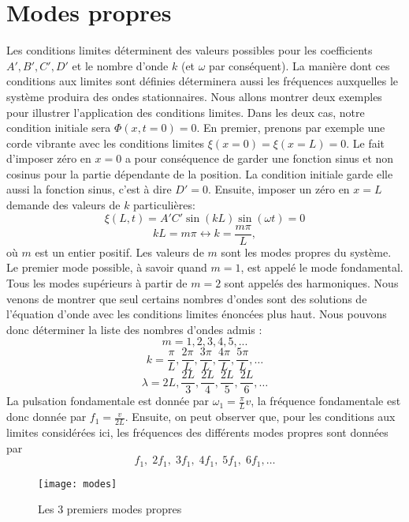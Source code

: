 \section{Modes propres}
Les conditions limites déterminent des valeurs possibles pour les coefficients $A', B', C', D'$ et le nombre d'onde $k$ (et $\omega$ par conséquent). La manière dont ces conditions aux limites sont définies déterminera aussi les fréquences auxquelles le système produira des ondes stationnaires.
Nous allons montrer deux exemples pour illustrer l'application des conditions limites. Dans les deux cas, notre condition initiale sera $\Phi(x,t=0)=0$. En premier, prenons par exemple une corde vibrante  avec les conditions limites $\xi(x=0)=\xi(x=L)=0$. Le fait d'imposer zéro en $x=0$ a pour conséquence de garder une fonction sinus et non cosinus pour la partie dépendante de la position. La condition initiale garde elle aussi la fonction sinus, c'est à dire $D'=0$. Ensuite, imposer un zéro en $x=L$ demande des valeurs de $k$ particulières: 
\[\xi(L,t)=A'C'\sin(kL)\sin(\omega t)=0\]
\[ kL = m\pi \leftrightarrow k=\frac{m\pi}{L},\] 
où $m$ est un entier positif. Les valeurs de $m$ sont les modes propres du système. Le premier mode possible, à savoir quand $m=1$, est appelé le mode fondamental. Tous les modes supérieurs à partir de $m=2$ sont appelés des harmoniques. Nous venons de montrer que seul certains nombres d'ondes sont des solutions de l'équation d'onde avec les conditions limites énoncées plus haut. Nous pouvons donc déterminer la liste des nombres d'ondes admis : 
$$ m = 1,2,3,4,5,...$$
$$ k = \frac{\pi}{L},\frac{2\pi}{L},\frac{3\pi}{L},\frac{4\pi}{L},\frac{5\pi}{L},\dots$$
$$ \lambda = 2L,\frac{2L}{3},\frac{2L}{4},\frac{2L}{5},\frac{2L}{6},\dots $$
La pulsation fondamentale est donnée par $\omega_1=\frac{\pi}{L}v$, la fréquence fondamentale est donc donnée par $f_1=\frac{v}{2L}$. Ensuite, on peut observer que, pour les conditions aux limites considérées ici, les fréquences des différents modes propres sont données par
$$ f_1,\; 2f_1,\; 3f_1,\; 4f_1,\; 5f_1,\; 6f_1, \dots$$


\begin{figure}[h]\centering
	\texttt{[image: modes]}
	\caption{Les 3 premiers modes propres}
\end{figure}

